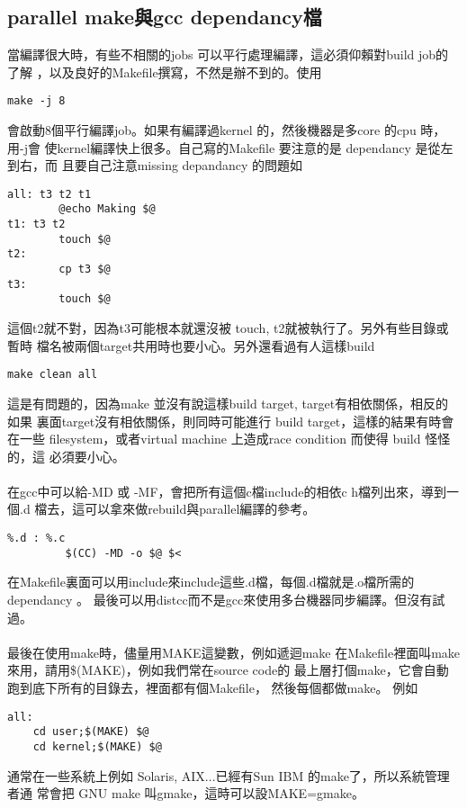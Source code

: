   \subsection{parallel make與gcc dependancy檔}
  當編譯很大時，有些不相關的jobs 可以平行處理編譯，這必須仰賴對build job的了解
  ，以及良好的Makefile撰寫，不然是辦不到的。使用
  \begin{verbatim}
make -j 8
  \end{verbatim}
  會啟動8個平行編譯job。如果有編譯過kernel 的，然後機器是多core 的cpu 時，用-j會
  使kernel編譯快上很多。自己寫的Makefile 要注意的是 dependancy 是從左到右，而
  且要自己注意missing depandancy 的問題如
  \begin{verbatim}
all: t3 t2 t1
        @echo Making $@
t1: t3 t2
        touch $@
t2:
        cp t3 $@
t3:
        touch $@
  \end{verbatim}
  這個t2就不對，因為t3可能根本就還沒被 touch, t2就被執行了。另外有些目錄或暫時
  檔名被兩個target共用時也要小心。另外還看過有人這樣build
  \begin{verbatim}
make clean all
  \end{verbatim}
  這是有問題的，因為make 並沒有說這樣build target, target有相依關係，相反的如果
  裏面target沒有相依關係，則同時可能進行 build target，這樣的結果有時會在一些
  filesystem，或者virtual machine 上造成race condition 而使得 build 怪怪的，這
  必須要小心。
  \\\\
  在gcc中可以給-MD 或 -MF，會把所有這個c檔include的相依c h檔列出來，導到一個.d
  檔去，這可以拿來做rebuild與parallel編譯的參考。
  \begin{verbatim}
%.d : %.c
         $(CC) -MD -o $@ $<
  \end{verbatim}
  在Makefile裏面可以用include來include這些.d檔，每個.d檔就是.o檔所需的dependancy
  。 最後可以用distcc而不是gcc來使用多台機器同步編譯。但沒有試過。
  \\\\
  最後在使用make時，儘量用MAKE這變數，例如遞迴make
  在Makefile裡面叫make來用，請用\$(MAKE)，例如我們常在source code的
  最上層打個make，它會自動跑到底下所有的目錄去，裡面都有個Makefile，
  然後每個都做make。 例如
  \begin{verbatim}
all:
	cd user;$(MAKE) $@
	cd kernel;$(MAKE) $@
  \end{verbatim}
  通常在一些系統上例如 Solaris, AIX...已經有Sun IBM 的make了，所以系統管理者通
  常會把 GNU make 叫gmake，這時可以設MAKE=gmake。

